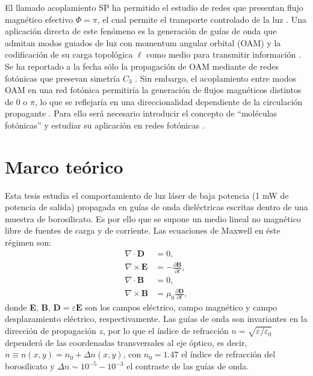 \documentclass{article}
\begin{document}
	El llamado acoplamiento SP ha permitido el estudio de redes que presentan flujo magnético efectivo $\Phi = \pi$, el cual permite el transporte controlado de la luz \cite{OAMCaging, ABCaging}. Una aplicación directa de este fenómeno es la generación de guías de onda que admitan modos guiados de luz con momentum angular orbital (OAM) y la codificación de su carga topológica $\ell$ como medio para transmitir información \cite{oamapp, oamfree}. Se ha reportado a la fecha sólo la propagación de OAM mediante de redes fotónicas que presevan simetría $C_3$ \cite{OAMWG, vortex}. Sin embargo, el acoplamiento entre modos OAM en una red fotónica permitiría la generación de flujos magnéticos distintos de $0$ o $\pi$, lo que se reflejaría en una direccionalidad dependiente de la circulación propagante \cite{vortextrim, topoOAM}. Para ello será necesario introducir el concepto de ``moléculas fotónicas'' \cite{molecules} y estudiar su aplicación en redes fotónicas \cite{SPSSH}.
\section{Marco teórico}

Esta tesis estudia el comportamiento de luz láser de baja potencia (1 mW de potencia de salida) propagada en guías de onda dieléctricas escritas dentro de una muestra de borosilicato. Es por ello que se supone un medio lineal no magnético libre de fuentes de carga y de corriente. Las ecuaciones de Maxwell en éste régimen son:
\begin{align}
	\nabla\cdot\textbf{D} &= 0, \label{eqn:gauss}
	\\	
	\nabla\times\textbf{E} &= -\frac{\partial \textbf{B}}{\partial t}, \label{eqn:faraday-lenz}
	\\	
	\nabla\cdot\textbf{B} &= 0,
	\\	
	\nabla\times\textbf{B} &= \mu_0\frac{\partial \textbf{D}}{\partial t}, \label{eqn:ampere-maxwell}
\end{align}
donde \textbf{E}, \textbf{B}, $\textbf{D}=\varepsilon\textbf{E}$ son los campos eléctrico, campo magnético y campo desplazamiento eléctrico, respectivamente. Las guías de onda son invariantes en la dirección de propagación $z$, por lo que el índice de refracción $n=\sqrt{\varepsilon/\varepsilon_0}$ dependerá de las coordenadas transversales al eje óptico, es decir, $n \equiv n(x,y) = n_0 + \Delta n(x,y)$, con $n_0=1.47$ el índice de refracción del borosilicato y $\Delta n \sim 10^{-5}-10^{-3}$ el contraste de las guías de onda.
\end{document}
